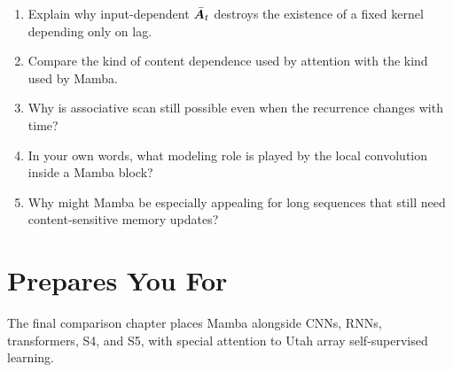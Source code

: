 \begin{enumerate}
  \item Explain why input-dependent $\bar{\bm{A}}_t$ destroys the existence of a fixed kernel
  depending only on lag.
  \item Compare the kind of content dependence used by attention with the kind used by
  Mamba.
  \item Why is associative scan still possible even when the recurrence changes with time?
  \item In your own words, what modeling role is played by the local convolution inside a
  Mamba block?
  \item Why might Mamba be especially appealing for long sequences that still need
  content-sensitive memory updates?
\end{enumerate}

\section{Prepares You For}

The final comparison chapter places Mamba alongside CNNs, RNNs, transformers, S4, and S5,
with special attention to Utah array self-supervised learning.
